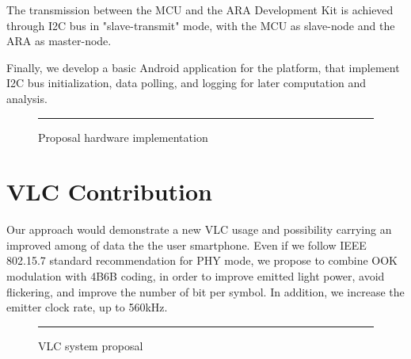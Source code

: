 The transmission between the MCU and the ARA Development Kit is achieved through I2C bus in "slave-transmit" mode, with the MCU as slave-node and the ARA as master-node.

Finally, we develop a basic Android application for the platform, that implement I2C bus initialization, data polling, and logging for later computation and analysis.

\begin{figure}[htbp]
  \centering
    \rule{35em}{0.5pt}
  \caption[Proposal hardware implementation]{Proposal hardware implementation}
  \label{fig:RxCircuit}
\end{figure}



\section{VLC Contribution}

Our approach would demonstrate a new VLC usage and possibility carrying an improved among of data the the user smartphone. Even if we follow IEEE 802.15.7 standard recommendation for PHY mode, we propose to combine OOK modulation with 4B6B coding, in order to improve emitted light power, avoid flickering, and improve the number of bit per symbol. In addition, we increase the emitter clock rate, up to 560kHz.

\begin{figure}[htbp]
  \centering
    \rule{35em}{0.5pt}
  \caption[VLC system proposal]{VLC system proposal}
  \label{fig:RxCircuit}
\end{figure}